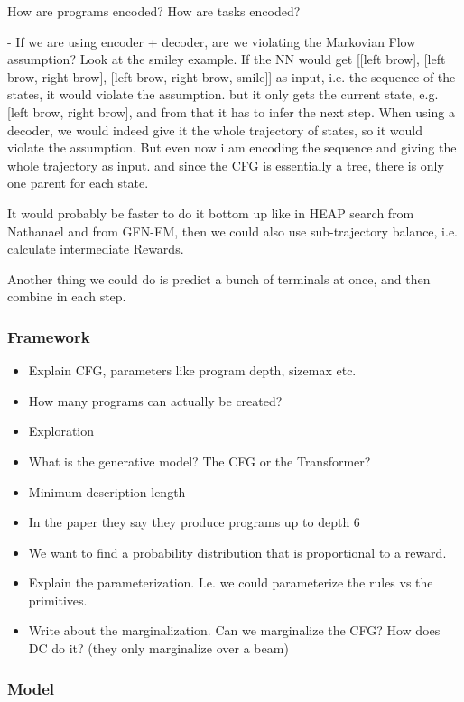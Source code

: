 How are programs encoded?
How are tasks encoded?



- If we are using encoder + decoder, are we violating the Markovian Flow assumption?
    Look at the smiley example. If the NN would get [[left brow], [left brow, right brow], [left brow, right brow, smile]] as input, i.e. the sequence of the states, it would violate the assumption. but it only gets the current state, e.g. [left brow, right brow], and from that it has to infer the next step. 
    When using a decoder, we would indeed give it the whole trajectory of states, so it would violate the assumption.
    But even now i am encoding the sequence and giving the whole trajectory as input. and since the CFG is essentially a tree, there is only one parent for each state. 

It would probably be faster to do it bottom up like in HEAP search from Nathanael and from GFN-EM, then we could also use sub-trajectory balance, i.e. calculate intermediate Rewards. 

Another thing we could do is predict a bunch of terminals at once, and then combine in each step. 


\subsubsection{Framework}
\begin{itemize}
    \item Explain CFG, parameters like program depth, sizemax etc. 
    \item How many programs can actually be created?
    \item Exploration
    \item What is the generative model? The CFG or the Transformer?
    \item Minimum description length
    \item In the paper they say they produce programs up to depth 6
    \item We want to find a probability distribution that is proportional to a reward.
    \item Explain the parameterization. I.e. we could parameterize the rules vs the primitives. 
    \item Write about the marginalization. Can we marginalize the CFG? How does DC do it? (they only marginalize over a beam) 
\end{itemize}

\subsubsection{Model}

